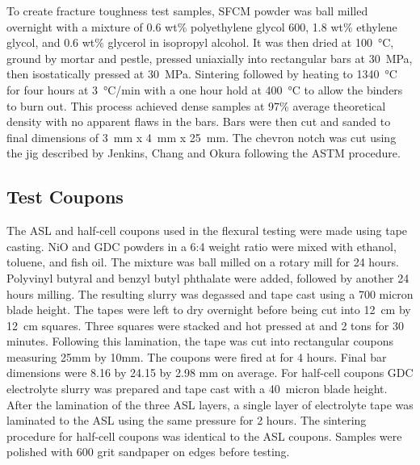         To create fracture toughness test samples, SFCM powder was ball milled overnight with a mixture of 0.6 wt\% polyethylene glycol 600, 1.8 wt\% ethylene glycol, and 0.6 wt\% glycerol in isopropyl alcohol.
        It was then dried at \SI{100}{\celsius}, ground by mortar and pestle, pressed uniaxially into rectangular bars at \SI{30}{\mega\pascal}, then isostatically pressed at \SI{30}{\mega\pascal}.
        Sintering followed by heating to \SI{1340}{\celsius} for four hours at \SI{3}{\celsius/min}  with a one hour hold at \SI{400}{\celsius} to allow the binders to burn out.
        This process achieved dense samples at 97\% average theoretical density with no apparent flaws in the bars.
        Bars were then cut and sanded to final dimensions of \SI{3}{mm} x \SI{4}{mm} x \SI{25}{mm}.
        The chevron notch was cut using the jig described by Jenkins, Chang and Okura following the ASTM procedure.\cite{Jenkins1988, ASTM2016a}

    \subsection{Test Coupons}
        The ASL and half-cell coupons used in the flexural testing were made using tape casting.
        NiO and GDC powders in a 6:4 weight ratio were mixed with ethanol, toluene, and fish oil.
        The mixture was ball milled on a rotary mill for 24 hours.
        Polyvinyl butyral and benzyl butyl phthalate were added, followed by another 24 hours milling.
        The resulting slurry was degassed and tape cast using a 700 micron blade height.
        The tapes were left to dry overnight before being cut into \SI{12}{\centi\meter} by \SI{12}{\centi\meter} squares.
        Three squares were stacked and hot pressed at  and 2 tons for 30 minutes.
        Following this lamination, the tape was cut into rectangular coupons measuring 25mm by 10mm.
        The coupons were fired at  for 4 hours.
        Final bar dimensions were 8.16 by 24.15 by 2.98 mm on average.
        For half-cell coupons GDC electrolyte slurry was prepared and tape cast with a \SI{40}{micron} blade height.
        After the lamination of the three ASL layers, a single layer of electrolyte tape was laminated to the ASL using the same pressure for 2 hours.
        The sintering procedure for half-cell coupons was identical to the ASL coupons.
        Samples were polished with 600 grit sandpaper on edges before testing.

